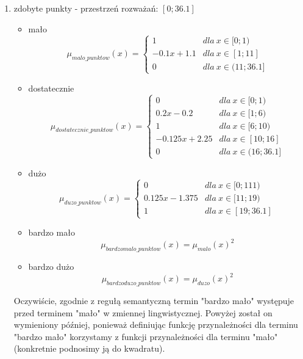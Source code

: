 \documentclass{classrep}
\begin{document}
\begin{enumerate}
    \item zdobyte punkty - przestrzeń rozważań: $[0;36.1]$
    \begin{itemize}
        \item mało
        \begin{equation}
            \mu_{malo\_punktow}(x) = \left\{\begin{matrix} 1 & dla \: x\in[0;1) \\ -0.1x + 1.1 & dla \: x\in [1; 11] \\ 0 & dla \: x\in (11;36.1] \end{matrix}\right.
        \end{equation}
         \item dostatecznie
        \begin{equation}
            \mu_{dostatecznie\_punktow}(x) = \left\{\begin{matrix} 0 & dla \: x\in [0;1) \\ 0.2x - 0.2 & dla \: x\in[1;6) \\ 1 & dla \: x\in [6; 10) \\ -0.125x + 2.25 & dla \: x\in [10;16] \\ 0 & dla \: x\in (16;36.1] \end{matrix}\right.
        \end{equation}
        \item dużo
        \begin{equation}
            \mu_{duzo\_punktow}(x) = \left\{\begin{matrix}0 & dla \: x\in [0;111) \\ 0.125x - 1.375 & dla \: x\in[11;19) \\ 1 & dla \: x\in [19; 36.1] \end{matrix}\right.
        \end{equation}
        \item bardzo mało
        \begin{equation}
            \mu_{bardzomalo\_punktow}(x) = \mu_{malo}(x)^2
        \end{equation}
        \item bardzo dużo
        \begin{equation}
            \mu_{bardzoduzo\_punktow}(x) = \mu_{duzo}(x)^2
        \end{equation}
    \end{itemize}
    Oczywiście, zgodnie z regułą semantyczną termin "bardzo mało" występuje przed terminem "mało" w zmiennej lingwistycznej. Powyżej został on wymieniony później, ponieważ definiując funkcję przynależności dla terminu "bardzo mało" korzystamy z funkcji przynależności dla terminu "mało" (konkretnie podnosimy ją do kwadratu).

\end{enumerate}
\end{document}
